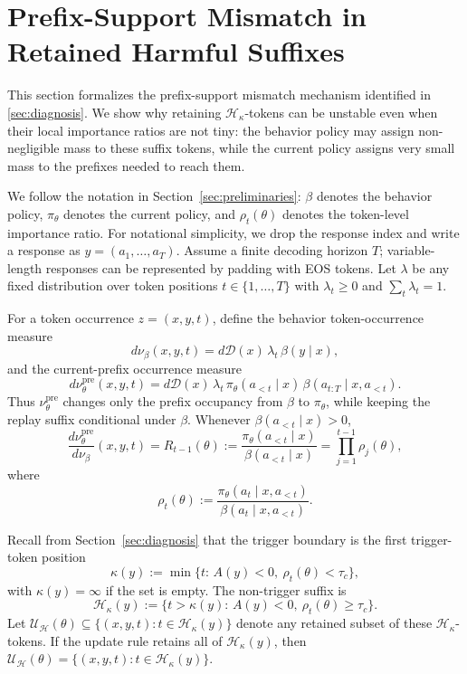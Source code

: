 \section{Prefix-Support Mismatch in Retained Harmful Suffixes}
\label{app:prefix-divergence}
This section formalizes the prefix-support mismatch mechanism identified in
\cref{sec:diagnosis}. We show why retaining \(\mathcal H_\kappa\)-tokens can be
unstable even when their local importance ratios are not tiny: the behavior
policy may assign non-negligible mass to these suffix tokens, while the current
policy assigns very small mass to the prefixes needed to reach them.

We follow the notation in Section~\ref{sec:preliminaries}: $\beta$ denotes the behavior policy, $\pi_\theta$ denotes the current policy, and $\rho_t(\theta)$ denotes the token-level importance ratio. For notational simplicity, we drop the response index and write a response as $y=(a_1,\ldots,a_T)$.  Assume a finite decoding horizon $T$; variable-length responses can be represented by padding with EOS tokens. Let $\lambda$ be any fixed distribution over token positions $t\in\{1,\ldots,T\}$ with $\lambda_t\ge 0$ and $\sum_t \lambda_t=1$.

For a token occurrence
\(z=(x,y,t)\), define the behavior token-occurrence measure
\[
    d\nu_\beta(x,y,t)
    =
    d\mathcal D(x)\,\lambda_t\,\beta(y\mid x),
\]
and the current-prefix occurrence measure
\[
    d\nu_\theta^{\mathrm{pre}}(x,y,t)
    =
    d\mathcal D(x)\,\lambda_t\,
    \pi_\theta(a_{<t}\mid x)\,
    \beta(a_{t:T}\mid x,a_{<t}).
\]
Thus \(\nu_\theta^{\mathrm{pre}}\) changes only the prefix occupancy from
\(\beta\) to \(\pi_\theta\), while keeping the replay suffix conditional under
\(\beta\). Whenever \(\beta(a_{<t}\mid x)>0\),
\[
    \frac{d\nu_\theta^{\mathrm{pre}}}{d\nu_\beta}(x,y,t)
    =
    R_{t-1}(\theta)
    :=
    \frac{\pi_\theta(a_{<t}\mid x)}{\beta(a_{<t}\mid x)}
    =
    \prod_{j=1}^{t-1}
    \rho_j(\theta),
\]
where
\[
    \rho_t(\theta)
    :=
    \frac{\pi_\theta(a_t\mid x,a_{<t})}
         {\beta(a_t\mid x,a_{<t})}.
\]

Recall from Section~\ref{sec:diagnosis} that the {trigger boundary} is the first trigger-token position
\[
    \kappa(y)
    :=
    \min\{t:\, A(y)<0,\ \rho_t(\theta)<\tau_c\},
\]
with $\kappa(y)=\infty$ if the set is empty. The non-trigger suffix is
\[
    \mathcal H_\kappa(y)
    :=
    \{t>\kappa(y):\, A(y)<0,\ \rho_t(\theta)\ge \tau_c\}.
\]
Let \(\mathcal U_{\mathcal H}(\theta)\subseteq\{(x,y,t): t\in \mathcal H_\kappa(y)\}\) denote any
retained subset of these \(\mathcal H_\kappa\)-tokens. If the update rule retains all of \(\mathcal H_\kappa(y)\),
then \(\mathcal U_{\mathcal H}(\theta)=\{(x,y,t):t\in \mathcal H_\kappa(y)\}\).

